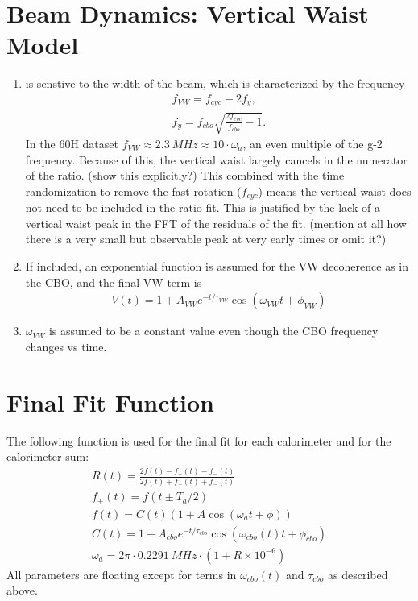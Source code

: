 \section{Beam Dynamics: Vertical Waist Model}

\begin{enumerate}
	\item{\wa is senstive to the width of the beam, which is characterized by the frequency 
		\begin{gather}
			f_{VW} = f_{cyc} - 2f_{y}, \\
			f_{y} = f_{cbo} \sqrt{\frac{2f_{cyc}}{f_{cbo}} - 1}.
		\end{gather}
	In the 60H dataset $f_{VW} \approx \SI{2.3}{MHz} \approx 10 \cdot \omega_{a}$, an even multiple of the g-2 frequency. Because of this, the vertical waist largely cancels in the numerator of the ratio. (show this explicitly?) This combined with the time randomization to remove the fast rotation ($f_{cyc}$) means the vertical waist does not need to be included in the ratio fit. This is justified by the lack of a vertical waist peak in the FFT of the residuals of the fit. (mention at all how there is a very small but observable peak at very early times or omit it?)
	}
	\item{If included, an exponential function is assumed for the VW decoherence as in the CBO, and the final VW term is 
		\begin{gather}
				V(t) = 1 + A_{VW} e^{-t/\tau_{VW}} \cos(\omega_{VW}t + \phi_{VW})
		\end{gather}
	}
	\item{$\omega_{VW}$ is assumed to be a constant value even though the CBO frequency changes vs time.}
\end{enumerate}


\section{Final Fit Function}

The following function is used for the final fit for each calorimeter and for the calorimeter sum:
\begin{gather}
		R(t) = \frac{2f(t) - f_{+}(t) - f_{-}(t)}{2f(t) + f_{+}(t) + f_{-}(t)} \\[10pt]
		f_{\pm}(t) = f(t \pm T_{a}/2) \\[10pt]
		f(t) = C(t) (1 + A \cos(\omega_{a}t + \phi)) \\[10pt]
		C(t) = 1 + A_{cbo} e^{-t/\tau_{cbo}} \cos(\omega_{cbo}(t)t + \phi_{cbo}) \\[10pt]
		\omega_{a} = 2 \pi \cdot \SI{0.2291}{MHz} \cdot (1 + R \times 10^{-6})
\end{gather}
All parameters are floating except for terms in $\omega_{cbo}(t)$ and $\tau_{cbo}$ as described above.



